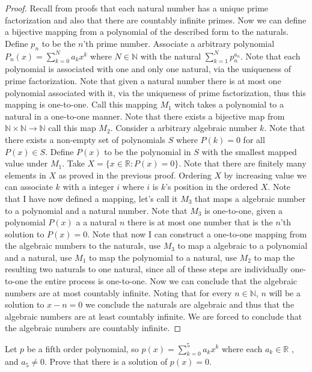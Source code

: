 \documentclass[12pt]{article}
\makeatletter
\theoremstyle{homework}
\newenvironment{exercise}[1]
{\def\@currentlabel{#1}\exercisecore}
{\endexercisecore}
\makeatother
\begin{document}
\begin{proof}
Recall from proofs that each natural number has a unique prime factorization and also that there are countably infinite primes.  Now we can define a bijective mapping from a polynomial of the described form to the naturals.  Define $p_n$ to be the $n$'th prime number.  Associate a arbitrary polynomial $P_n(x)=\sum_{k=0}^N a_k x^k$ where $N\in\mathbb{N}$ with the natural $\sum^N_{k=1}p_n^{a_n}$.  Note that each polynomial is associated with one and only one natural, via the uniqueness of prime factorization.  Note that given a natural number there is at most one polynomial associated with it, via the uniqueness of prime factorization, thus this mapping is one-to-one.  Call this mapping $M_1$ witch takes a polynomial to a natural in a one-to-one manner.  Note that there exists a bijective map from $\mathbb{N}\times \mathbb{N}\rightarrow\mathbb{N}$ call this map $M_2$.  Consider a arbitrary algebraic number $k$.  Note that there exists a non-empty set of polynomials $S$ where $P(k)=0$ for all $P(x)\in S$.  Define $P(x)$ to be the polynomial in $S$ with the smallest mapped value under $M_1$.  Take $X=\{x\in\mathbb{R}:P(x)=0\}$.  Note that there are finitely many elements in $X$ as proved in the previous proof.  Ordering $X$ by increasing value we can associate $k$ with a integer $i$ where $i$ is $k$'s position in the ordered $X$.  Note that I have now defined a mapping, let's call it $M_3$ that maps a algebraic number to a polynomial and a natural number.  Note that $M_3$ is one-to-one, given a polynomial $P(x)$ a a natural $n$ there is at most one number that is the $n$'th solution to $P(x)=0$.  Note that now I can construct a one-to-one mapping from the algebraic numbers to the naturals, use $M_3$ to map a algebraic to a polynomial and a natural, use $M_1$ to map the polynomial to a natural, use $M_2$ to map the resulting two naturals to one natural, since all of these steps are individually one-to-one the entire process is one-to-one.  Now we can conclude that the algebraic numbers are at most countably infinite.  Noting that for every $n\in\mathbb{N}$, $n$ will be a solution to $x-n=0$ we conclude the naturals are algebraic and thus that the algebraic numbers are at least countably infinite.  We are forced to conclude that the algebraic numbers are countably infinite.
\end{proof}
\begin{exercise}
3
Let $p$ be a fifth order polynomial, so $p(x) = \sum^5_{k=0} a_kx^k$ where each $a_k\in\mathbb{R}$ , and $a_5 \neq 0$.
Prove that there is a solution of $p(x) = 0$.
\end{exercise}
\end{document}
